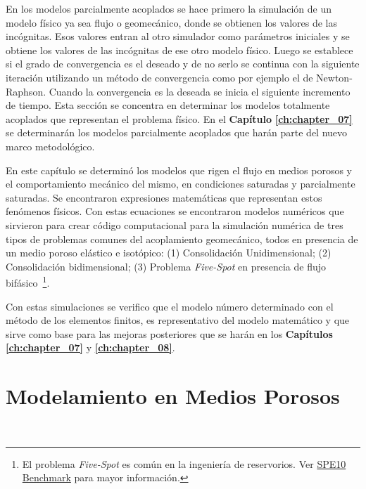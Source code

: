 En los modelos parcialmente acoplados se hace primero la simulación de un modelo físico ya sea flujo o geomecánico, donde se obtienen los valores de las incógnitas. Esos valores entran al otro simulador como parámetros iniciales y se obtiene los valores de las incógnitas de ese otro modelo físico. Luego se establece si el grado de convergencia es el deseado y de no serlo se continua con la siguiente iteración utilizando un método de convergencia como por ejemplo el de Newton-Raphson. Cuando la convergencia es la deseada se inicia el siguiente incremento de tiempo. Esta sección se concentra en determinar los modelos totalmente acoplados que representan el problema físico. En el \textbf{Capítulo} \textbf{\ref{ch:chapter_07}} se determinarán los modelos parcialmente acoplados que harán parte del nuevo marco metodológico.\bigskip

En este capítulo se determinó los modelos que rigen el flujo en medios porosos y el comportamiento mecánico del mismo, en condiciones saturadas y parcialmente saturadas. Se encontraron expresiones matemáticas que representan estos fenómenos físicos. Con estas ecuaciones se encontraron modelos numéricos que sirvieron para crear código computacional para la simulación numérica de tres tipos de problemas comunes del acoplamiento geomecánico, todos en presencia de un medio poroso elástico e isotópico: (1) Consolidación Unidimensional; (2) Consolidación bidimensional; (3) Problema \textit{Five-Spot} en presencia de flujo bifásico~\footnote{El problema \textit{Five-Spot} es común en la ingeniería de reservorios. Ver \href{https://www.spe.org/web/csp/datasets/set02.htm}{SPE10 Benchmark} para mayor información.}.\bigskip

Con estas simulaciones se verifico que el modelo número determinado con el método de los elementos finitos, es representativo del modelo matemático y que sirve como base para las mejoras posteriores que se harán en los \textbf{Capítulos} \textbf{\ref{ch:chapter_07}} y \textbf{\ref{ch:chapter_08}}.



\section{Modelamiento en Medios Porosos}~\hypertarget{sec:sec310}{}
\label{sec:sec310}

